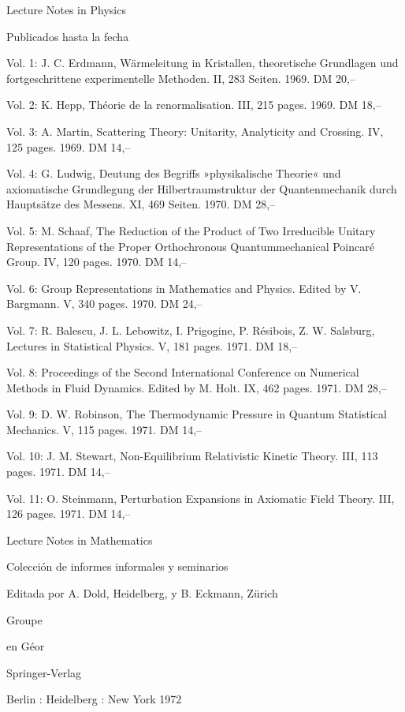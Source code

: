 \medskip
\noindent
Lecture Notes in Physics\par
Publicados hasta la fecha\par
Vol. 1: J. C. Erdmann, Wärmeleitung in Kristallen, theoretische Grundlagen und fortgeschrittene experimentelle Methoden. II, 283 Seiten. 1969. DM 20,--\par
Vol. 2: K. Hepp, Théorie de la renormalisation. III, 215 pages. 1969. DM 18,--\par
Vol. 3: A. Martin, Scattering Theory: Unitarity, Analyticity and Crossing. IV, 125 pages. 1969. DM 14,--\par
Vol. 4: G. Ludwig, Deutung des Begriffs »physikalische Theorie« und axiomatische Grundlegung der Hilbertraumstruktur der Quantenmechanik durch Hauptsätze des Messens. XI, 469 Seiten. 1970. DM 28,--\par
Vol. 5: M. Schaaf, The Reduction of the Product of Two Irreducible Unitary Representations of the Proper Orthochronous Quantummechanical Poincaré Group. IV, 120 pages. 1970. DM 14,--\par
Vol. 6: Group Representations in Mathematics and Physics. Edited by V. Bargmann. V, 340 pages. 1970. DM 24,--\par
Vol. 7: R. Balescu, J. L. Lebowitz, I. Prigogine, P. Résibois, Z. W. Salsburg, Lectures in Statistical Physics. V, 181 pages. 1971. DM 18,--\par
Vol. 8: Proceedings of the Second International Conference on Numerical Methods in Fluid Dynamics. Edited by M. Holt. IX, 462 pages. 1971. DM 28,--\par
Vol. 9: D. W. Robinson, The Thermodynamic Pressure in Quantum Statistical Mechanics. V, 115 pages. 1971. DM 14,--\par
Vol. 10: J. M. Stewart, Non-Equilibrium Relativistic Kinetic Theory. III, 113 pages. 1971. DM 14,--\par
Vol. 11: O. Steinmann, Perturbation Expansions in Axiomatic Field Theory. III, 126 pages. 1971. DM 14,--\par
\clearpage

\begin{center}
Lecture Notes in Mathematics

Colección de informes informales y seminarios

Editada por A. Dold, Heidelberg, y B. Eckmann, Zürich


\bigskip
Groupe

en Géor

\bigskip
Springer-Verlag

Berlin : Heidelberg : New York 1972
\end{center}
\clearpage

